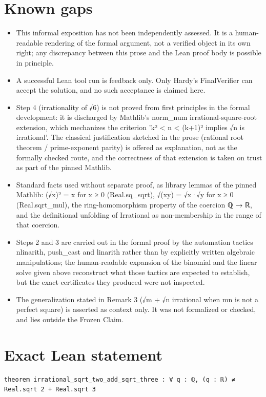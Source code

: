 \documentclass[11pt]{article}
\begin{document}
\section*{Known gaps}
\begin{itemize}
\item This informal exposition has not been independently assessed. It is a human-readable rendering of the formal argument, not a verified object in its own right; any discrepancy between this prose and the Lean proof body is possible in principle.
\item A successful Lean tool run is feedback only. Only Hardy's FinalVerifier can accept the solution, and no such acceptance is claimed here.
\item Step 4 (irrationality of √6) is not proved from first principles in the formal development: it is discharged by Mathlib's norm\_num irrational-square-root extension, which mechanizes the criterion 'k² < n < (k+1)² implies √n is irrational'. The classical justification sketched in the prose (rational root theorem / prime-exponent parity) is offered as explanation, not as the formally checked route, and the correctness of that extension is taken on trust as part of the pinned Mathlib.
\item Standard facts used without separate proof, as library lemmas of the pinned Mathlib: (√x)² = x for x ≥ 0 (Real.sq\_sqrt), √(xy) = √x·√y for x ≥ 0 (Real.sqrt\_mul), the ring-homomorphism property of the coercion ℚ → ℝ, and the definitional unfolding of Irrational as non-membership in the range of that coercion.
\item Steps 2 and 3 are carried out in the formal proof by the automation tactics nlinarith, push\_cast and linarith rather than by explicitly written algebraic manipulations; the human-readable expansion of the binomial and the linear solve given above reconstruct what those tactics are expected to establish, but the exact certificates they produced were not inspected.
\item The generalization stated in Remark 3 (√m + √n irrational when mn is not a perfect square) is asserted as context only. It was not formalized or checked, and lies outside the Frozen Claim.
\end{itemize}

\section*{Exact Lean statement}
\begin{Verbatim}[fontsize=\small]
theorem irrational_sqrt_two_add_sqrt_three : ∀ q : ℚ, (q : ℝ) ≠ Real.sqrt 2 + Real.sqrt 3
\end{Verbatim}
\end{document}

